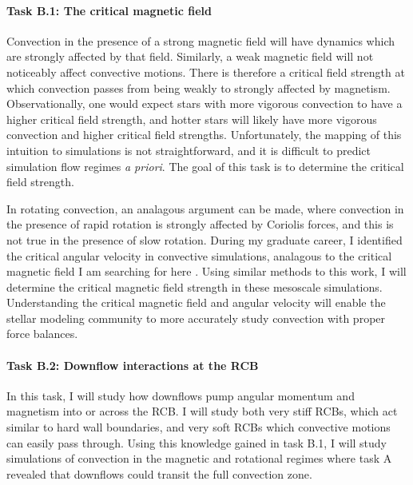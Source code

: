 \documentclass[11pt, preprint]{aastex}
\begin{document}
\vspace{-0.5cm}
\paragraph{Task B.1: The critical magnetic field}
\label{sct:taskB1}
Convection in the presence of a strong magnetic field will have dynamics which are strongly affected by that field.
Similarly, a weak magnetic field will not noticeably affect convective motions.
There is therefore a critical field strength at which convection passes from being weakly to strongly affected by magnetism.
Observationally, one would expect stars with more vigorous convection to have a higher critical field strength, and hotter stars will likely have more vigorous convection and higher critical field strengths.
Unfortunately, the mapping of this intuition to simulations is not straightforward, and it is difficult to predict simulation flow regimes \emph{a priori}.
The goal of this task is to determine the critical field strength.

In rotating convection, an analagous argument can be made, where convection in the presence of rapid rotation is strongly affected by Coriolis forces, and this is not true in the presence of slow rotation.
During my graduate career, I identified the critical angular velocity in convective simulations, analagous to the critical magnetic field I am searching for here \citep[][and Fig. \ref{fig:rossby_plot}]{anders&all2019}.
Using similar methods to this work, I will determine the critical magnetic field strength in these mesoscale simulations.
Understanding the critical magnetic field and angular velocity will enable the stellar modeling community to more accurately study convection with proper force balances.

\vspace{-0.5cm}
\paragraph{Task B.2: Downflow interactions at the RCB}
\label{sct:taskB2}
In this task, I will study how downflows pump angular momentum and magnetism into or across the RCB.
I will study both very stiff RCBs, which act similar to hard wall boundaries, and very soft RCBs which convective motions can easily pass through.
Using this knowledge gained in task B.1, I will study simulations of convection in the magnetic and rotational regimes where task A revealed that downflows could transit the full convection zone.
\end{document}
